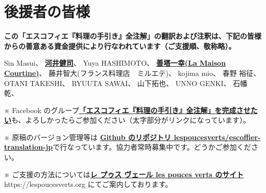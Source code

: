 \hypertarget{benefactors}{%
\section{後援者の皆様}\label{benefactors}}

\thispagestyle{empty}

\small

\textbf{この「エスコフィエ『料理の手引き』全注解」の翻訳および注釈は、下記の皆様からの善意ある資金提供により行なわれています（ご支援順、敬称略）。}

\normalsize
\vspace{1\zw}

Sin Masui、\href{20180524-23h,2x,novelsoundsmail@gmail.com}{}
\href{http://www.undecesjours.com/}{\textbf{河井健司}}、\href{20180525-0h14,10x,20180605-11h42,10x,kwibeng@gmail.com}{}
Yuya HASHIMOTO、\href{20180525-1h40,2x,hashimo0910@gmail.com}{}
\href{http://www.courtine.jp/}{\textbf{善塔一幸(La Maison
Courtine)}}、\href{20180525-8h56,10x,kazuyukizento120@docomo.ne.jp}{}
藤井智大(フランス料理店　ミルエテ)、\href{20180525-10h07,1x,apple19761019@yahoo.co.jp}{}
kojima mio、\href{20180525-12h23,1x,teeeeshow@yahoo.co.jp}{} 春野
裕征、\href{20180528-2h41,1x,amanojack.v-o-v@i.softbank.jp}{} OTANI
TAKESHI、\href{20180529-17h26,2x,1000feuille@ezweb.ne.jp}{} RYUUTA
SAWAI、\href{20180530-2h57.1x,rs.ajtk.zz@i.softbank.jp}{}
山下拓也、\href{20180605-11h04,5x,FB:Takuya\%20Yamashita}{} UNNO
GENKI、\href{20180605-22h12,1x,guriiva@aol.com}{}
石幡乾、\href{201806060-6h24,1x,zonek.gentile.bonheur.ken05@gmail.com}{}

\vfill

\small

※ Facebook
のグループ\href{https://www.facebook.com/groups/1548833425201180/}{\textbf{「エスコフィエ『料理の手引き』全注解」を完成させたい}}も、よろしかったらご参加ください（太字部分がリンクになっています）。

※ 原稿のバージョン管理等は
\href{https://github.com/lespoucesverts/escoffier-translation-jp}{\textbf{Github
のリポジトリ
lespoucesverts/escoffier-translation-jp}}で行なっています。協力者常時募集中です。どうかご参加ください。

※
ご支援の方法については\href{https://lespoucesverts.org/archives/7042}{\textbf{レ
プゥス ヴェール les pouces verts のサイト}} https://lespoucesverts.org
にてご案内しております。

\normalsize
